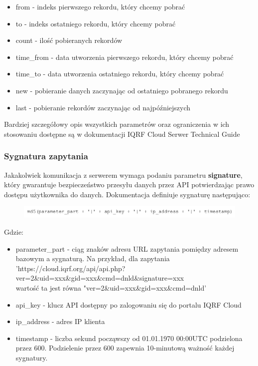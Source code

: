 \begin{itemize}
    \item from - indeks pierwszego rekordu, który chcemy pobrać
    \item to - indeks ostatniego rekordu, który chcemy pobrać
    \item count - ilość pobieranych rekordów
    \item time\_from - data utworzenia pierwszego rekordu, który chcemy pobrać 
    \item time\_to - data utworzenia ostatniego rekordu, który chcemy pobrać
    \item new - pobieranie danych zaczynając od ostatniego pobranego rekordu
    \item last - pobieranie rekordów zaczynając od najpóźniejszych
\end{itemize}

Bardziej szczegółowy opis wszystkich parametrów oraz ograniczenia w ich stosowaniu dostępne są w dokumentacji IQRF Cloud Serwer Technical Guide 
\cite{iqrfcloud-guide}

\subsubsection{Sygnatura zapytania}

Jakakolwiek komunikacja z serwerem wymaga podaniu parametru \textbf{signature}, który gwarantuje bezpieczeństwo przesyłu danych przez API 
potwierdzając prawo dostępu użytkownika do danych. Dokumentacja \cite{iqrfcloud-guide} definiuje sygnaturę następująco:

\begin{figure}[H]
    \includegraphics[width=\textwidth]{zdj/md5.png}
\end{figure}

Gdzie: 

\begin{itemize}
    \item parameter\_part - ciąg znaków adresu URL zapytania pomiędzy adresem bazowym a sygnaturą. Na przykład, dla zapytania \\
'https://cloud.iqrf.org/api/api.php?ver=2\&uid=xxx\&gid=xxx\&cmd=dnld\&signature=xxx \\ 
wartość ta jest równa "ver=2\&uid=xxx\&gid=xxx\&cmd=dnld'
    \item api\_key - klucz API dostępny po zalogowaniu się do portalu IQRF Cloud
    \item ip\_address - adres IP klienta
    \item timestamp - liczba sekund począwszy od 01.01.1970 00:00UTC podzielona przez 600. Podzielenie przez 600 zapewnia 10-minutową
ważność każdej sygnatury.
\end{itemize}

